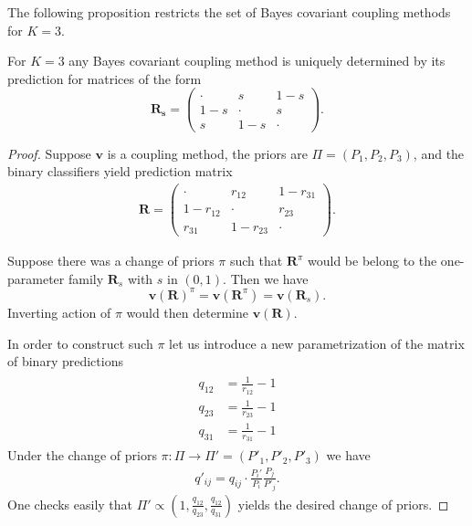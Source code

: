 The following proposition restricts the set of Bayes covariant coupling methods for $K=3$.

\begin{prop} \label{prop:bc3}
	For $K=3$ any Bayes covariant coupling method is uniquely determined by its prediction for  matrices of the form
	$$
	\boldsymbol{R_s} = \begin{pmatrix} \cdot & s & 1 -s \\  1-s & \cdot & s \\ s & 1-s & \cdot \end{pmatrix}.
	$$
\end{prop}
\begin{proof}
	Suppose $\boldsymbol{v}$ is a coupling method,  the priors are $\Pi = (P_1, P_2,P_3)$, and the binary classifiers yield prediction matrix 
	\begin{align}
		\boldsymbol{R} = \begin{pmatrix} \cdot & r_{12} & 1 - r_{31} \\ 1-r_{12} & \cdot & r_{23} \\
			r_{31} & 1- r_{23} & \cdot \end{pmatrix}.
	\end{align}
	
	Suppose there was a change of priors $\pi$ such that $\boldsymbol{R}^\pi$ would be belong to the one-parameter family $\boldsymbol{R}_s$ with $s$ in $(0,1)$. Then we have
	$$
	\boldsymbol{v}(\boldsymbol{R})^\pi = \boldsymbol{v}(\boldsymbol{R}^\pi) = \boldsymbol{v}(\boldsymbol{R}_s).
	$$
	Inverting action of $\pi$ would then determine $\boldsymbol{v}(\boldsymbol{R})$.
	
	In order to construct such $\pi$ let us introduce a new parametrization of the matrix of binary  predictions
	\begin{align}
		\begin{split}
			q_{12} &= \frac{1}{r_{12}} -1 \\
			q_{23} &= \frac{1}{r_{23}} -1 \\
			q_{31} &= \frac{1}{r_{31}} -1 
		\end{split}
	\end{align}
	Under the change of priors $\pi:\Pi \rightarrow \Pi' = (P'_1, P'_2, P'_3)$ we have
	\begin{align}
		q'_{ij}	= q_{ij} \cdot \frac{P_i'}{P_i} \frac{P_j}{P'_j}.
	\end{align}
	One checks easily that $\Pi' \propto (1, \frac{q_{12}}{q_{23}}, \frac{q_{12}}{q_{31}})$ yields the desired change of priors.
	
\end{proof}


